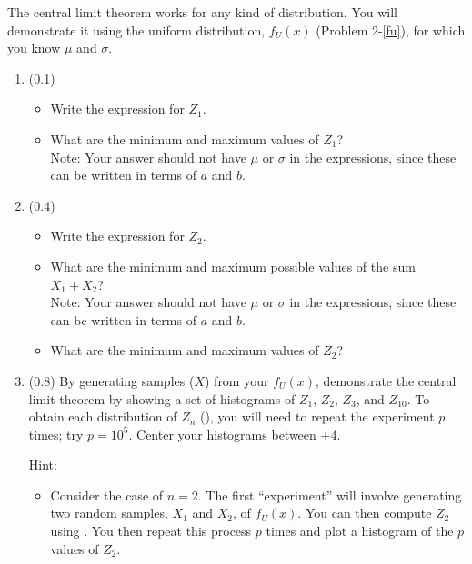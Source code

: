 \documentclass[11pt,titlepage,fleqn]{article}
\begin{document}
\begin{enumerate}
The central limit theorem works for any kind of distribution. You will demonstrate it using the uniform distribution, $f_U(x)$ (Problem 2-\ref{fu}), for which you know $\mu$ and $\sigma$.

\begin{enumerate}

\item (0.1)
\begin{itemize}
\item Write the expression for $Z_1$.
\item What are the minimum and maximum values of $Z_1$? \\
Note: Your answer should not have $\mu$ or $\sigma$ in the expressions, since these can be written in terms of $a$ and $b$.
\end{itemize}

\item (0.4)
\begin{itemize}
\item Write the expression for $Z_2$.
\item What are the minimum and maximum possible values of the sum $X_1 + X_2$? \\
Note: Your answer should not have $\mu$ or $\sigma$ in the expressions, since these can be written in terms of $a$ and $b$.
\item What are the minimum and maximum values of $Z_2$?
\end{itemize}

\item (0.8) By generating samples ($X$) from your $f_U(x)$, demonstrate the central limit theorem by showing a set of histograms of $Z_1$, $Z_2$, $Z_3$, and $Z_{10}$. To obtain each distribution of $Z_n$ (), you will need to repeat the experiment $p$ times; try $p = 10^5$. Center your histograms between $\pm 4$.

Hint:
\begin{itemize}
\item Consider the case of $n=2$. The first ``experiment'' will involve generating two random samples, $X_1$ and $X_2$, of $f_U(x)$. You can then compute $Z_2$ using . You then repeat this process $p$ times and plot a histogram of the $p$ values of $Z_2$.
\end{itemize}

\end{enumerate}

\end{enumerate}

\end{document}
